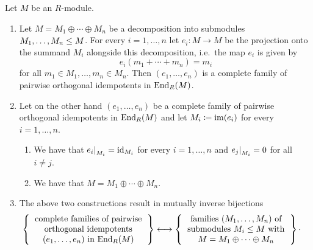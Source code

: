 \begin{theorem}
  \label{theorem: correspondence idempotents and direct decompositions}
  Let $M$ be an $R$-module.
  \begin{enumerate}
    \item
      Let $M = M_1 \oplus \dotsb \oplus M_n$ be a decomposition into submodules $M_1, \dotsc, M_n \leq M$.
      For every $i = 1, \dotsc, n$ let $e_i \colon M \to M$ be the projection onto the summand $M_i$ alongside this decomposition, i.e.\ the map $e_i$ is given by
      \[
          e_i (m_1 + \dotsb + m_n)
        = m_i
      \]
      for all $m_1 \in M_1, \dotsc, m_n \in M_n$.
      Then $(e_1, \dotsc, e_n)$ is a complete family of pairwise orthogonal idempotents in $\operatorname{End}_R(M)$.
    \item
      Let on the other hand $(e_1, \dotsc, e_n)$ be a complete family of pairwise orthogonal idempotents in $\operatorname{End}_R(M)$ and let $M_i \coloneqq \operatorname{im}(e_i)$ for every $i = 1, \dotsc, n$.
      \begin{enumerate}
        \item
          We have that $\restrict{e_i}{M_i} = \id_{M_i}$ for every $i = 1, \dotsc, n$ and $\restrict{e_j}{M_i} = 0$ for all $i \neq j$.
        \item
          We have that $M = M_1 \oplus \dotsb \oplus M_n$.
      \end{enumerate}
    \item
      The above two constructions result in mutually inverse bijections
      \begin{align*}
        \left\{
          \begin{tabular}{c}
            complete families of pairwise \\
            orthogonal idempotents  \\
            $(e_1, \dotsc, e_n)$ in $\End_R(M)$
          \end{tabular}
        \right\}
        &\longleftrightarrow
         \left\{
          \begin{tabular}{c}
            families $(M_1, \dotsc, M_n)$ of  \\
            submodules $M_i \moduleleq M$ with \\
            $M = M_1 \oplus \dotsb \oplus M_n$
          \end{tabular}
          \right\} \cdotp
      \end{align*}
  \end{enumerate}
\end{theorem}


